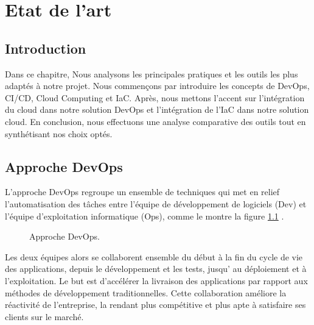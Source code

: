 \chapter{Etat de l'art}
\section*{Introduction}
Dans ce chapitre, Nous analysons les principales pratiques et les outils les plus adaptés à notre projet. Nous commençons par introduire les concepts de DevOps, CI/CD, Cloud Computing et IaC. Après, nous mettons l'accent sur l’intégration du cloud dans notre solution DevOps et l'intégration de l'IaC dans notre solution cloud. En conclusion, nous effectuons une analyse comparative des outils tout en synthétisant nos choix optés.

\section{Approche DevOps}
L'approche DevOps \cite{crochetdamais2019} regroupe un ensemble de techniques qui met en relief l'automatisation des tâches entre l'équipe de développement de logiciels (Dev) et l'équipe d'exploitation informatique (Ops), comme le montre la figure \ref{fig:devops} \cite{kim2022}.
        \begin{figure}[H]
        \centering
        \caption{Approche DevOps.}
        \label{fig:devops}
        \end{figure}
Les deux équipes alors se collaborent ensemble du début à la fin du cycle de vie des applications, depuis le développement et les tests, jusqu' au déploiement et à l'exploitation. Le but est d'accélérer la livraison des applications par rapport aux méthodes de développement traditionnelles. Cette collaboration améliore la réactivité de l'entreprise, la rendant plus compétitive et plus apte à satisfaire ses clients sur le marché.

